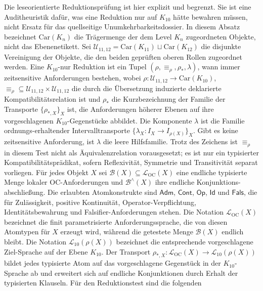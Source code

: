 Die leseorientierte Reduktionsprüfung ist hier explizit und begrenzt. Sie ist eine Auditheuristik dafür,
was eine Reduktion nur auf \(K_{10}\) hätte bewahren müssen, nicht Ersatz für das quellseitige
Unumkehrbarkeitsdossier. In diesem Absatz bezeichnet \(\mathrm{Car}(K_n)\) die Trägermenge der dem Level
\(K_n\) zugeordneten Objekte, nicht das Ebenenetikett. Sei
\(\mathcal{U}_{11,12}=\mathrm{Car}(K_{11})\sqcup \mathrm{Car}(K_{12})\) die disjunkte Vereinigung der
Objekte, die den beiden geprüften oberen Rollen zugeordnet werden. Eine \(K_{10}\)-nur Reduktion ist ein
Tupel \((\rho,\equiv_{\rho},\rho_{\ast},\lambda)\), wann immer zeitsensitive Anforderungen bestehen, wobei
\(\rho:\mathcal{U}_{11,12}\to \mathrm{Car}(K_{10})\),
\(\equiv_{\rho}\subseteq\mathcal{U}_{11,12}\times\mathcal{U}_{11,12}\) die durch die Übersetzung induzierte
deklarierte Kompatibilitätsrelation ist und \(\rho_{\ast}\) die Kurzbezeichnung der Familie der Transporte
\(\{\rho_{\ast,X}\}_X\) ist, die Anforderungen höherer Ebenen auf ihre vorgeschlagenen
\(K_{10}\)-Gegenstücke abbildet. Die Komponente \(\lambda\) ist die Familie ordnungs-erhaltender
Intervalltransporte \(\{\lambda_X:I_X\to I_{\rho(X)}\}_X\). Gibt es keine zeitsensitive Anforderung,
ist \(\lambda\) die leere Hilfsfamilie. Trotz des Zeichens ist \(\equiv_{\rho}\) in diesem Test nicht als Äquivalenzrelation
vorausgesetzt; es ist nur ein typisierter Kompatibilitätsprädikat, sofern Reflexivität, Symmetrie und
Transitivität separat vorliegen. Für jedes Objekt \(X\) sei \(\mathcal{B}(X)\subseteq\mathcal{L}_{\mathrm{OC}}(X)\)
eine endliche typisierte Menge lokaler OC-Anforderungen und \(\mathcal{B}^{\wedge}(X)\) ihre endliche Konjunktions-
abschließung. Die erlaubten Atomkonstrukte sind \(\mathsf{Adm}\), \(\mathsf{Cont}\), \(\mathsf{Op}\),
\(\mathsf{Id}\) und \(\mathsf{Fals}\), die für Zulässigkeit, positive Kontinuität, Operator-Verpflichtung,
Identitätsbewahrung und Falsifier-Anforderungen stehen. Die Notation \(\mathcal{L}_{\mathrm{OC}}(X)\) bezeichnet
die finit parametrisierte Anforderungssprache, die von diesen Atomtypen für \(X\) erzeugt wird, während die
getestete Menge \(\mathcal{B}(X)\) endlich bleibt. Die Notation \(\mathcal{L}_{10}(\rho(X))\) bezeichnet
die entsprechende vorgeschlagene Ziel-Sprache auf der Ebene \(K_{10}\). Der Transport
\(\rho_{\ast,X}:\mathcal{L}_{\mathrm{OC}}(X)\to\mathcal{L}_{10}(\rho(X))\) bildet jedes typisierte
Atom auf das vorgeschlagene Gegenstück in der \(K_{10}\)-Sprache ab und erweitert sich auf endliche
Konjunktionen durch Erhalt der typisierten Klauseln. Für den Reduktionstest sind die folgenden
